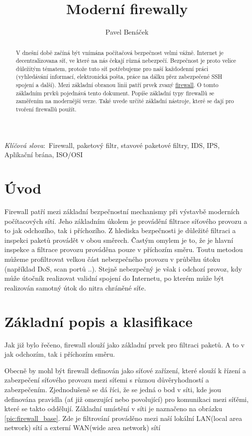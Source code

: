\documentclass[11pt,a4paper]{article}
\title{Moderní firewally}
\author{Pavel Benáček}
\def\keywords{\vspace{.5em}
{\textit{Klíčová slova}:\,\relax%
}}
\begin{document}
\maketitle

\begin{abstract}

V dnešní době začíná být vnímána počítačová bezpečnost velmi vážně. Internet je decentralizovana síť, ve které na nás čekají různá nebezpečí. Bezpečnost je proto velice důležitým tématem, protože tuto síť potřebujeme pro naší každodenní práci (vyhledávání informací, elektronická pošta, práce na dálku přez zabezpečené SSH spojení a další). Mezi základní obranou linii patří prvek zvaný \underline{firewall}. O tomto základním prvků pojednává tento dokument. Popíše základní typy firewallů se zaměřením na modernější verze. Také uvede určité základní nástroje, které se dají pro tvoření firewallů použít.
\end{abstract}

\keywords{Firewall, paketový filtr, stavové paketové filtry, IDS, IPS, Aplikační brána, ISO/OSI}

\tableofcontents

\section{Úvod}

Firewall patří mezi základní bezpečnostní mechanismy při výstavbě moderních počítacových sítí. Jeho základním úkolem je provádění filtrace síťového provozu a to jak odchozího, tak i příchozího. Z hlediska bezpečnosti je důležité filtraci a inspekci paketů provádět v obou směrech. Častým omylem je to, že je hlavní inspekce a filtrace provozu prováděna pouze v příchozím směru. Toutu metodou můžeme profiltrovat velkou část nebezpečného provozu v průběhu útoku (například DoS, scan portů ..). Stejně nebezpečný je však i odchozí provoz, kdy může útočník realizovat validní spojení do Internetu, po kterém může být realizován samotný útok do nitra chráněné síťe.
 
\section{Základní popis a klasifikace}\label{sec:defend} 

Jak již bylo řečeno, firewall slouží jako základní prvek pro filtraci paketů. A to v jak odchozím, tak i příchozím směru.

Obecně by mohl být firewall definován jako síťové zařízení, které slouží k řízení a zabezpečení síťového provozu mezi síťemi s různou důvěryhodností a zabezpečením. Zjednodušeně se dá říci, že se jedná o bod v síti, kde jsou definována pravidla (ať již omezující nebo povolující) pro komunikaci mezi síťěmi, které se takto oddělují. Základní umístění v síti je naznačeno na obrázku \ref{pic:firewall_base}. Zde je filtrování prováděno mezi naší lokální LAN(local area network) sítí a externí WAN(wide area network) sítí
\end{document}
